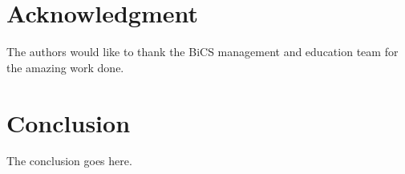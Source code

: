 \documentclass[conference,compsoc]{IEEEtran}
\begin{document}
\section*{Acknowledgment}
The authors would like to thank the BiCS management and education team for the amazing work done.


\section{Conclusion}
The conclusion goes here.

%
%



%
%
\end{document}
